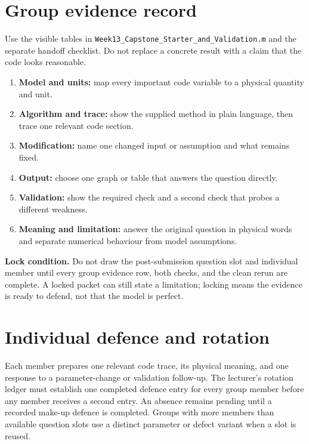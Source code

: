 \documentclass[11pt,a4paper]{article}
\begin{document}
\section*{Group evidence record}
Use the visible tables in \texttt{Week13\_Capstone\_Starter\_and\_Validation.m} and the separate handoff checklist. Do not replace a concrete result with a claim that the code looks reasonable.
\begin{enumerate}[nosep,leftmargin=6mm]
\item \textbf{Model and units:} map every important code variable to a physical quantity and unit.
\item \textbf{Algorithm and trace:} show the supplied method in plain language, then trace one relevant code section.
\item \textbf{Modification:} name one changed input or assumption and what remains fixed.
\item \textbf{Output:} choose one graph or table that answers the question directly.
\item \textbf{Validation:} show the required check and a second check that probes a different weakness.
\item \textbf{Meaning and limitation:} answer the original question in physical words and separate numerical behaviour from model assumptions.
\end{enumerate}
\begin{checkbox}\textbf{Lock condition.} Do not draw the post-submission question slot and individual member until every group evidence row, both checks, and the clean rerun are complete. A locked packet can still state a limitation; locking means the evidence is ready to defend, not that the model is perfect.\end{checkbox}
\section*{Individual defence and rotation}
Each member prepares one relevant code trace, its physical meaning, and one response to a parameter-change or validation follow-up. The lecturer's rotation ledger must establish one completed defence entry for every group member before any member receives a second entry. An absence remains pending until a recorded make-up defence is completed. Groups with more members than available question slots use a distinct parameter or defect variant when a slot is reused.
\end{document}
